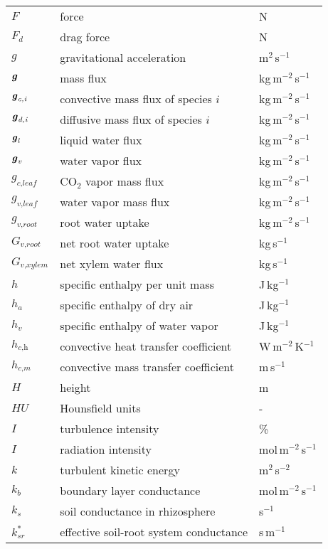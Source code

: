 \begin{longtable}{p{}p{}p{}}
	$F$ & force & N \\	
	$F_d$ & drag force & N \\		
	$g$ & gravitational acceleration & m$^2$\,s$^{-1}$ \\ 
	$\textbf{\textit{g}}$ & mass flux & kg\,m$^{-2}$\,s$^{-1}$ \\ 		
	$\textbf{\textit{g}}_{\textit{c,i}}$ & convective mass flux of species $i$ & kg\,m$^{-2}$\,s$^{-1}$ \\ 			
	$\textbf{\textit{g}}_{\textit{d,i}}$ & diffusive mass flux of species $i$ & kg\,m$^{-2}$\,s$^{-1}$ \\ 				
	$\textbf{\textit{g}}_{\textit{l}}$ & liquid water flux & kg\,m$^{-2}$\,s$^{-1}$ \\ 		
	$\textbf{\textit{g}}_{\textit{v}}$ & water vapor flux & kg\,m$^{-2}$\,s$^{-1}$ \\ 		
	$g_{\textit{c,leaf}}$ & CO$_2$ vapor mass flux & kg\,m$^{-2}$\,s$^{-1}$ \\ 	
	$g_{\textit{v,leaf}}$ & water vapor mass flux & kg\,m$^{-2}$\,s$^{-1}$ \\ 	
	$g_{\textit{v,root}}$ & root water uptake & kg\,m$^{-2}$\,s$^{-1}$ \\ 		
	$G_{\textit{v,root}}$ & net root water uptake & kg\,s$^{-1}$ \\ 		
	$G_{\textit{v,xylem}}$ & net xylem water flux & kg\,s$^{-1}$ \\ 		
	$h$ & specific enthalpy per unit mass & J\,kg$^{-1}$ \\ 
	$h_a$ & specific enthalpy of dry air & J\,kg$^{-1}$ \\ 	
	$h_v$ & specific enthalpy of water vapor & J\,kg$^{-1}$ \\ 		
	$h_{\textit{c,h}}$ & convective heat transfer coefficient & W\,m$^{-2}$\,K$^{-1}$ \\ 
	$h_{\textit{c,m}}$ & convective mass transfer coefficient & m\,s$^{-1}$ \\ 
	$H$ & height & m \\ 
	$HU$ & Hounsfield units & - \\ 
	$I$ & turbulence intensity & \% \\
	$I$ & radiation intensity & mol\,m$^{-2}$\,s$^{-1}$\\	
	$k$ & turbulent kinetic energy & m$^2$\,s$^{-2}$ \\ 
	$k_b$ & boundary layer conductance & mol\,m$^{-2}$\,s$^{-1}$  \\ 		
	$k_s$ & soil conductance in rhizosphere & s$^{-1}$  \\ 		
	$k_{\textit{sr}}^*$ & effective soil-root system conductance & s\,m$^{-1}$  \\ 	


\end{longtable}
